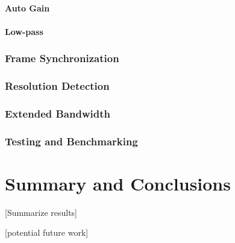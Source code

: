 \documentclass[a4paper,12pt,twoside,openright]{report}
\begin{document}
\subsubsection{Auto Gain}

\subsubsection{Low-pass}

\subsection{Frame Synchronization}

\subsection{Resolution Detection}

\subsection{Extended Bandwidth}

\subsection{Testing and Benchmarking}

\chapter{Summary and Conclusions} 

[Summarize results]

[potential future work]

\appendix
\singlespacing

 
 
\end{document}
